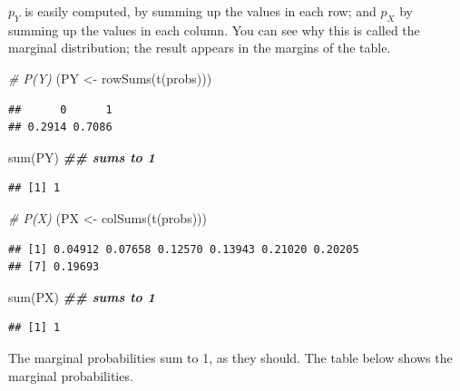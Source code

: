 \documentclass[
  12pt,
]{krantz}
\newenvironment{Shaded}{\begin{snugshade}}{\end{snugshade}}
\newcommand{\CommentTok}[1]{\textcolor[rgb]{0.56,0.35,0.01}{\textit{#1}}}
\newcommand{\DocumentationTok}[1]{\textcolor[rgb]{0.56,0.35,0.01}{\textbf{\textit{#1}}}}
\newcommand{\FunctionTok}[1]{\textcolor[rgb]{0.00,0.00,0.00}{#1}}
\newcommand{\NormalTok}[1]{#1}
\newcommand{\OtherTok}[1]{\textcolor[rgb]{0.56,0.35,0.01}{#1}}
\theoremstyle{definition}
\theoremstyle{definition}
\theoremstyle{definition}
\theoremstyle{definition}
\theoremstyle{remark}
\begin{document}
\(p_Y\) is easily computed, by summing up the values in each row; and \(p_X\) by summing up the values in each column. You can see why this is called the marginal distribution; the result appears in the margins of the table.

\begin{Shaded}
\begin{Highlighting}[]
\CommentTok{\# P(Y)}
\NormalTok{(PY }\OtherTok{\textless{}{-}} \FunctionTok{rowSums}\NormalTok{(}\FunctionTok{t}\NormalTok{(probs)))}
\end{Highlighting}
\end{Shaded}

\begin{verbatim}
##      0      1 
## 0.2914 0.7086
\end{verbatim}

\begin{Shaded}
\begin{Highlighting}[]
\FunctionTok{sum}\NormalTok{(PY) }\DocumentationTok{\#\# sums to 1}
\end{Highlighting}
\end{Shaded}

\begin{verbatim}
## [1] 1
\end{verbatim}

\begin{Shaded}
\begin{Highlighting}[]
\CommentTok{\# P(X)}
\NormalTok{(PX }\OtherTok{\textless{}{-}} \FunctionTok{colSums}\NormalTok{(}\FunctionTok{t}\NormalTok{(probs)))}
\end{Highlighting}
\end{Shaded}

\begin{verbatim}
## [1] 0.04912 0.07658 0.12570 0.13943 0.21020 0.20205
## [7] 0.19693
\end{verbatim}

\begin{Shaded}
\begin{Highlighting}[]
\FunctionTok{sum}\NormalTok{(PX) }\DocumentationTok{\#\# sums to 1}
\end{Highlighting}
\end{Shaded}

\begin{verbatim}
## [1] 1
\end{verbatim}

The marginal probabilities sum to 1, as they should. The table below shows the marginal probabilities.
\end{document}
